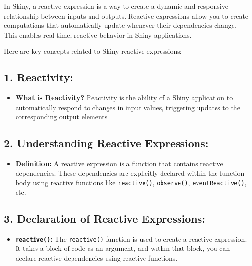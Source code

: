 \documentclass[
]{book}
\providecommand{\tightlist}{%
  \setlength{\itemsep}{0pt}\setlength{\parskip}{0pt}}
\begin{document}
In Shiny, a reactive expression is a way to create a dynamic and responsive relationship between inputs and outputs. Reactive expressions allow you to create computations that automatically update whenever their dependencies change. This enables real-time, reactive behavior in Shiny applications.

Here are key concepts related to Shiny reactive expressions:

\hypertarget{reactivity}{%
\subsection{\texorpdfstring{1. \textbf{Reactivity:}}{1. Reactivity:}}\label{reactivity}}

\begin{itemize}
\tightlist
\item
  \textbf{What is Reactivity?} Reactivity is the ability of a Shiny application to automatically respond to changes in input values, triggering updates to the corresponding output elements.
\end{itemize}

\hypertarget{understanding-reactive-expressions}{%
\subsection{\texorpdfstring{2. \textbf{Understanding Reactive Expressions:}}{2. Understanding Reactive Expressions:}}\label{understanding-reactive-expressions}}

\begin{itemize}
\tightlist
\item
  \textbf{Definition:} A reactive expression is a function that contains reactive dependencies. These dependencies are explicitly declared within the function body using reactive functions like \texttt{reactive()}, \texttt{observe()}, \texttt{eventReactive()}, etc.
\end{itemize}

\hypertarget{declaration-of-reactive-expressions}{%
\subsection{\texorpdfstring{3. \textbf{Declaration of Reactive Expressions:}}{3. Declaration of Reactive Expressions:}}\label{declaration-of-reactive-expressions}}

\begin{itemize}
\tightlist
\item
  \textbf{\texttt{reactive()}:} The \texttt{reactive()} function is used to create a reactive expression. It takes a block of code as an argument, and within that block, you can declare reactive dependencies using reactive functions.
\end{itemize}
\end{document}
